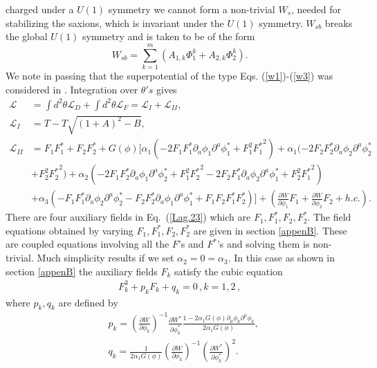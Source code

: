 \documentclass[a4paper,11pt]{article}
\def\non{\nonumber\\}
\def\non{\nonumber\\}
\begin{document}
  charged under a $U(1)$ symmetry we cannot form a non-trivial $W_s$, needed for stabilizing the saxions,
  which is invariant under the
  $U(1)$ symmetry. $W_{sb}$ breaks the global $U(1)$ symmetry and is taken to be of the form
  \begin{equation}
    W_{sb}=\sum_{k=1}^m\left(A_{1, k}\Phi_1^k+A_{2, k}\Phi_2^k\right).
    \label{w3}
  \end{equation}
  We note in passing that the superpotential of the type Eqs. (\ref{w1})-(\ref{w3}) was considered in \cite{Halverson:2017deq}.
  Integration over $\theta's$ gives
  \begin{align}
    \mathcal{L}
      &= \int d^2 \theta \mathcal{L}_D + \int d^2\theta \mathcal{L}_F = \mathcal{L}_I + \mathcal{L}_{II},\non
    \mathcal{L}_I &= T - T \sqrt{(1+A)^2 - B},\non
    \mathcal{L}_{II}& = F_1 F^*_1 + F_2 F^*_2
      + G(\phi) \Big[ \alpha_1(-2 F_1 F^*_1 \partial_a\phi_1 \partial^a \phi^*_1
      + F_1^2 {F^*_1}^2)
      + \alpha_1 (-2 F_2 F^*_2 \partial_a\phi_2 \partial^a \phi^*_2 \non
    & + F_2^2 {F^*_2}^2)
      + \alpha_2 (-2 F_1 F^*_2 \partial_a\phi_1 \partial^a \phi^*_2
      + F_1^2 {F^*_2}^2 -2 F_2 F^*_1 \partial_a\phi_2 \partial^a \phi^*_1
      + F_2^2 {F^*_1}^2) \non
    & + \alpha_3(
      -F_1 F^*_1 \partial_a \phi_2 \partial^a \phi^*_2 - F_2 F^*_2 \partial_a \phi_1 \partial^a \phi^*_1
      + F_1 F_2 F^*_1 F^*_2) \Big]
      + \left(\frac{\partial W}{\partial \phi_1}F_1+ \frac{\partial W}{\partial \phi_2}F_2 + h.c.\right).
    \label{Lag.23}
  \end{align}
  There are four auxiliary fields in Eq.~(\ref{Lag.23}) which are $F_1, F^*_1, F_2, F^*_2$. The field equations obtained by varying
  $F_1, F^*_1, F_2, F^*_2$ are given in section \ref{appenB}. These are coupled equations
  involving all the $F$'s and $F^*$'s
  and solving them is non-trivial. Much simplicity results if we set $ \alpha_2=0=\alpha_3$.
  In this case as
  shown in section \ref{appenB} the auxiliary fields $F_k$ satisfy the cubic equation
  \begin{align}
    F_k^3+ p_k F_k + q_k=0\,, k=1,2\,,
  \end{align}
  where $p_k, q_k$ are defined by
  \begin{equation}\label{DisplayFormulaNumbered:eq.twoDBI.p.1}
  \begin{split}
    & p_k={\left(\frac{\partial W}{\partial \phi_k}\right)}^{-1}\frac{\partial W^*}{\partial \phi^*_k}\frac{1-2\alpha_1 G\left(\phi\right)\partial_\mu \phi_k\partial^\mu \phi_k}{2\alpha_1 G\left(\phi\right)}, \\
    & q_k=\frac{1}{2\alpha_1 G\left(\phi\right)}{\left(\frac{\partial W}{\partial \phi_k}\right)}^{-1}{\left(\frac{\partial W^*}{\partial \phi^*_k}\right)}^2. \\
  \end{split}
  \end{equation}
\end{document}
